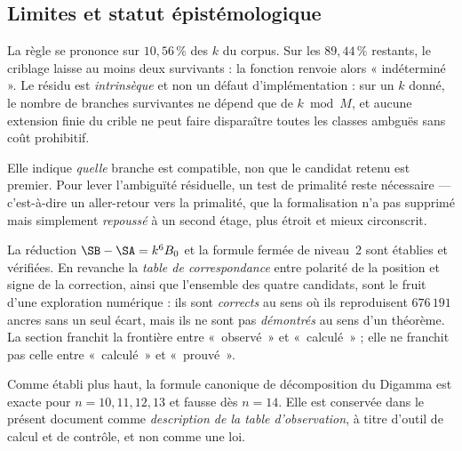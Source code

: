 \subsection{Limites et statut épistémologique}

\begin{boitealerte}
La règle se prononce sur $10{,}56\,\%$ des $k$ du corpus. Sur les
$89{,}44\,\%$ restants, le criblage laisse au moins deux survivants :
la fonction renvoie alors « indéterminé ». Le résidu est
\emph{intrinsèque} et non un défaut d'implémentation : sur un
$k$ donné, le nombre de branches survivantes ne dépend que de
$k \bmod M$, et aucune extension finie du crible ne peut faire
disparaître toutes les classes ambguës sans coût prohibitif.
\end{boitealerte}

\begin{boitealerte}
Elle indique \emph{quelle} branche est compatible, non que le candidat
retenu est premier. Pour lever l'ambiguïté résiduelle, un test de
primalité reste nécessaire --- c'est-à-dire un aller-retour vers la
primalité, que la formalisation n'a pas supprimé mais simplement
\emph{repoussé} à un second étage, plus étroit et mieux circonscrit.
\end{boitealerte}

\begin{boitealerte}
La réduction $\SB-\SA = k^{6}B_0$ et la formule fermée de niveau~2 sont
établies et vérifiées. En revanche la \emph{table de correspondance}
entre polarité de la position et signe de la correction, ainsi que
l'ensemble des quatre candidats, sont le fruit d'une exploration
numérique : ils sont \emph{corrects} au sens où ils reproduisent
$676\,191$ ancres sans un seul écart, mais ils ne sont pas
\emph{démontrés} au sens d'un théorème. La section franchit la
frontière entre «~observé~» et «~calculé~» ; elle ne franchit pas celle
entre «~calculé~» et «~prouvé~».
\end{boitealerte}

\begin{boitealerte}
Comme établi plus haut, la formule canonique de décomposition du
Digamma est exacte pour $n = 10, 11, 12, 13$ et fausse dès $n = 14$.
Elle est conservée dans le présent document comme \emph{description
de la table d'observation}, à titre d'outil de calcul et de
contrôle, et non comme une loi.
\end{boitealerte}

